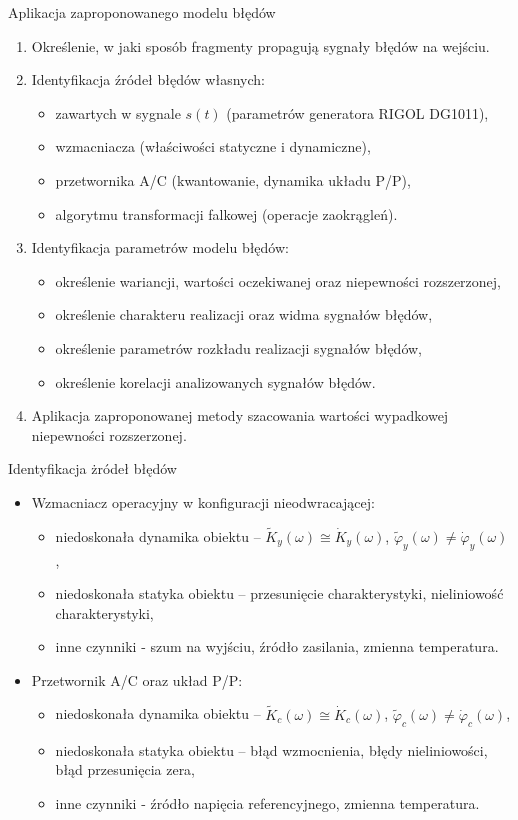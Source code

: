 \documentclass[12pt, polish, aspectratio = 169]{slides}
\begin{document}
\begin{frame}{Aplikacja zaproponowanego modelu błędów}
\begin{enumerate}
\item Określenie, w jaki sposób fragmenty propagują sygnały błędów na wejściu.
\item Identyfikacja źródeł błędów własnych:
	\begin{itemize}
	\item zawartych w sygnale $s(t)$ (parametrów generatora RIGOL DG1011),
	\item wzmacniacza (właściwości statyczne i dynamiczne),
	\item przetwornika A/C (kwantowanie, dynamika układu P/P),
	\item algorytmu transformacji falkowej (operacje zaokrągleń).
	\end{itemize}
\item Identyfikacja parametrów modelu błędów:
	\begin{itemize}
	\item określenie wariancji, wartości oczekiwanej oraz niepewności rozszerzonej,
	\item określenie charakteru realizacji oraz widma sygnałów błędów,
	\item określenie parametrów rozkładu realizacji sygnałów błędów,
	\item określenie korelacji analizowanych sygnałów błędów.
	\end{itemize}
\item Aplikacja zaproponowanej metody szacowania wartości wypadkowej niepewności rozszerzonej.
\end{enumerate}
\end{frame}

\begin{frame}{Identyfikacja żródeł błędów}
\begin{itemize}
\item Wzmacniacz operacyjny w konfiguracji nieodwracającej:
	\begin{itemize}
	\item niedoskonała dynamika obiektu -- $\tilde{K}_{y}(\omega) \cong \dot{K}_{y}(\omega)$, $\tilde{\varphi}_{y}(\omega) \ne \dot{\varphi}_{y}(\omega)$,
	\item niedoskonała statyka obiektu -- przesunięcie charakterystyki, nieliniowość charakterystyki,
	\item inne czynniki - szum na wyjściu, źródło zasilania, zmienna temperatura.
	\end{itemize}
\item Przetwornik A/C oraz układ P/P:
	\begin{itemize}
	\item niedoskonała dynamika obiektu -- $\tilde{K}_{c}(\omega) \cong \dot{K}_{c}(\omega)$, $\tilde{\varphi}_{c}(\omega) \ne \dot{\varphi}_{c}(\omega)$,
	\item niedoskonała statyka obiektu -- błąd wzmocnienia, błędy nieliniowości, błąd przesunięcia zera,
	\item inne czynniki - źródło napięcia referencyjnego, zmienna temperatura.
	\end{itemize}
\end{itemize}
\end{frame}
\end{document}
